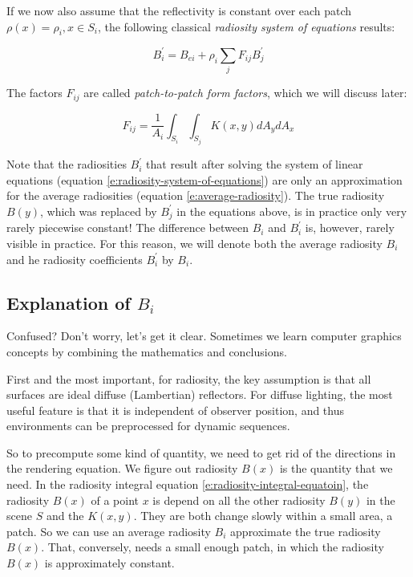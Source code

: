 If we now also assume that the reflectivity is constant over each patch $\rho(x)=\rho_i,x\in S_i$, the following classical \textit{radiosity system of equations} results:

\begin{equation}\label{e:radiosity-system-of-equations}
	B_{i}^{'}=B_{ei}+\rho_i\sum_j F_{ij}B^{'}_{j}
\end{equation}

The factors $F_{ij}$ are called \textit{patch-to-patch form factors}, which we will discuss later:

\begin{equation}
	F_{ij}=\frac{1}{A_i}\int_{S_i}\int_{S_j}K(x,y)dA_ydA_x
\end{equation}

Note that the radiosities $B^{'}_{i}$ that result after solving the system of linear equations (equation \ref{e:radiosity-system-of-equations}) are only an approximation for the average radiosities (equation \ref{e:average-radiosity}). The true radiosity $B(y)$, which was replaced by $B^{'}_j$ in the equations above, is in practice only very rarely piecewise constant! The difference between $B_{i}$ and $B_{i}^{'}$ is, however, rarely visible in practice. For this reason, we will denote both the average radiosity $B_{i}$ and he radiosity coefficients $B_{i}^{'}$ by $B_{i}$. 



\subsection{Explanation of $B_i$}
Confused? Don't worry, let's get it clear. Sometimes we learn computer graphics concepts by combining the mathematics and conclusions.

First and the most important, for radiosity, the key assumption is that all surfaces are ideal diffuse (Lambertian) reflectors. For diffuse lighting, the most useful feature is that it is independent of observer position, and thus environments can be preprocessed for dynamic sequences.

So to precompute some kind of quantity, we need to get rid of the directions in the rendering equation. We figure out radiosity $B(x)$ is the quantity that we need. In the radiosity integral equation \ref{e:radiosity-integral-equatoin}, the radiosity $B(x)$ of a point $x$ is depend on all the other radiosity $B(y)$ in the scene $S$ and the $K(x,y)$. They are both change slowly within a small area, a patch. So we can use an average radiosity $B_i$ approximate the true radiosity $B(x)$. That, conversely, needs a small enough patch, in which the radiosity $B(x)$ is approximately constant.

